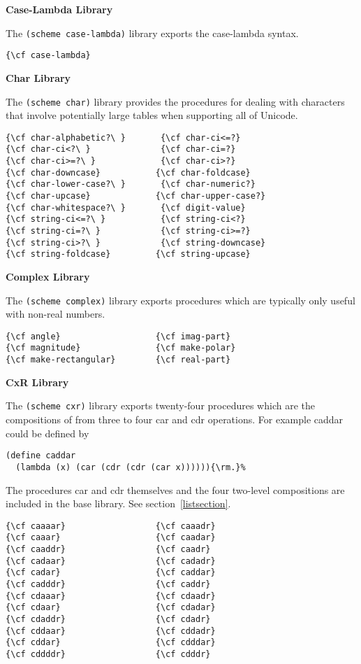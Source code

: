 \textbf{Case-Lambda Library}

The \texttt{(scheme case-lambda)} library exports the {\cf case-lambda}
syntax.

\begin{verbatim}
{\cf case-lambda}
\end{verbatim}

\textbf{Char Library}

The \texttt{(scheme char)} library provides the procedures for dealing with
characters that involve potentially large tables when supporting all of Unicode.

\begin{verbatim}
{\cf char-alphabetic?\ }       {\cf char-ci<=?}
{\cf char-ci<?\ }              {\cf char-ci=?}
{\cf char-ci>=?\ }             {\cf char-ci>?}
{\cf char-downcase}           {\cf char-foldcase}
{\cf char-lower-case?\ }       {\cf char-numeric?}
{\cf char-upcase}             {\cf char-upper-case?}
{\cf char-whitespace?\ }       {\cf digit-value}
{\cf string-ci<=?\ }           {\cf string-ci<?}
{\cf string-ci=?\ }            {\cf string-ci>=?}
{\cf string-ci>?\ }            {\cf string-downcase}
{\cf string-foldcase}         {\cf string-upcase}
\end{verbatim}

\textbf{Complex Library}

The \texttt{(scheme complex)} library exports procedures which are
typically only useful with non-real numbers.

\begin{verbatim}
{\cf angle}                   {\cf imag-part}
{\cf magnitude}               {\cf make-polar}
{\cf make-rectangular}        {\cf real-part}
\end{verbatim}

\textbf{CxR Library}

The \texttt{(scheme cxr)} library exports twenty-four procedures which
are the compositions of from three to four {\cf car} and {\cf cdr}
operations.  For example {\cf caddar} could be defined by

\begin{verbatim}
(define caddar
  (lambda (x) (car (cdr (cdr (car x)))))){\rm.}%
\end{verbatim}

The procedures {\cf car} and {\cf cdr} themselves and the four
two-level compositions are included in the base library.  See
section~\ref{listsection}.

\begin{verbatim}
{\cf caaaar}                  {\cf caaadr}
{\cf caaar}                   {\cf caadar}
{\cf caaddr}                  {\cf caadr}
{\cf cadaar}                  {\cf cadadr}
{\cf cadar}                   {\cf caddar}
{\cf cadddr}                  {\cf caddr}
{\cf cdaaar}                  {\cf cdaadr}
{\cf cdaar}                   {\cf cdadar}
{\cf cdaddr}                  {\cf cdadr}
{\cf cddaar}                  {\cf cddadr}
{\cf cddar}                   {\cf cdddar}
{\cf cddddr}                  {\cf cdddr}
\end{verbatim}

